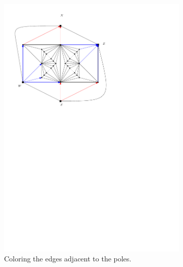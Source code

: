   \begin{figure}[h]
    \centering
    \begin{subfigure}[t]{0.3\textwidth}
      \includegraphics[width=\textwidth]{fixExtension/img/manymany1}
      \caption{Coloring the edges adjacent to the poles.}
      \label{fig:fix:manymany1}
    \end{subfigure}
    \quad
    \begin{subfigure}[t]{0.3\textwidth}

\end{subfigure}
\end{figure}
